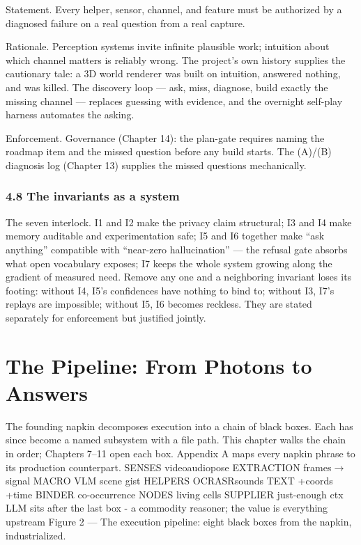 Statement. Every helper, sensor, channel, and feature must be authorized by a diagnosed failure on a real question from a real capture.

Rationale. Perception systems invite infinite plausible work; intuition about which channel matters is reliably wrong. The project's own history supplies the cautionary tale: a 3D world renderer was built on intuition, answered nothing, and was killed. The discovery loop --- ask, miss, diagnose, build exactly the missing channel --- replaces guessing with evidence, and the overnight self-play harness automates the asking.

Enforcement. Governance (Chapter 14): the plan-gate requires naming the roadmap item and the missed question before any build starts. The (A)/(B) diagnosis log (Chapter 13) supplies the missed questions mechanically.

\subsection{4.8 The invariants as a system}\label{the-invariants-as-a-system}

The seven interlock. I1 and I2 make the privacy claim structural; I3 and I4 make memory auditable and experimentation safe; I5 and I6 together make ``ask anything'' compatible with ``near-zero hallucination'' --- the refusal gate absorbs what open vocabulary exposes; I7 keeps the whole system growing along the gradient of measured need. Remove any one and a neighboring invariant loses its footing: without I4, I5's confidences have nothing to bind to; without I3, I7's replays are impossible; without I5, I6 becomes reckless. They are stated separately for enforcement but justified jointly.

\chapter{The Pipeline: From Photons to Answers}\label{the-pipeline-from-photons-to-answers}

The founding napkin decomposes execution into a chain of black boxes. Each has since become a named subsystem with a file path. This chapter walks the chain in order; Chapters 7--11 open each box. Appendix A maps every napkin phrase to its production counterpart. SENSES video\textperiodcentered{}audio\textperiodcentered{}pose EXTRACTION frames\(\rightarrow\)signal MACRO VLM scene gist HELPERS OCR\textperiodcentered{}ASR\textperiodcentered{}sounds TEXT +coords +time BINDER co-occurrence NODES living cells SUPPLIER just-enough ctx LLM sits after the last box - a commodity reasoner; the value is everything upstream Figure 2 --- The execution pipeline: eight black boxes from the napkin, industrialized.

